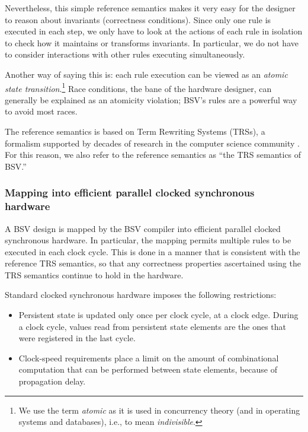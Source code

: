 \documentclass[twoside,letterpaper]{article}
\newcommand{\BSV}{BSV}
\begin{document}
Nevertheless, this simple reference semantics makes it very easy for 
the designer to reason about invariants (correctness conditions). Since 
only one rule is executed in each step, we only have to look at the 
actions of each rule in isolation to check how it maintains or transforms 
invariants. In particular, we do not have to consider interactions with 
other rules executing simultaneously.

Another way of saying this is: each rule execution can be viewed as an
\emph{atomic state transition}.\footnote{ We use the term
\emph{atomic} as it is used in concurrency theory (and in operating
systems and databases), i.e., to mean \emph{indivisible}.  }  Race
conditions, the bane of the hardware designer, can generally be
explained as an atomicity violation; {\BSV}'s rules are a powerful way
to avoid most races.

The reference semantics is based on Term Rewriting Systems (TRSs), a
formalism supported by decades of research in the computer science
community {\cite{Terese2003}}.  For this reason, we also refer to the
reference semantics as ``the TRS semantics of {\BSV}.''


\subsubsection{Mapping into efficient parallel clocked synchronous hardware}

\label{sec-mapping-rules-to-clocks}

A {\BSV} design is mapped by the {\BSV} compiler into efficient
parallel clocked synchronous hardware.  In particular, the mapping
permits multiple rules to be executed in each clock cycle.  This is
done in a manner that is consistent with the reference TRS semantics,
so that any correctness properties ascertained using the TRS semantics
continue to hold in the hardware.

Standard clocked synchronous hardware imposes the following
restrictions:
\begin{itemize}
\item
Persistent state is updated only once per clock cycle, at a clock edge.
During a clock cycle, values read from persistent state elements are 
the ones that were registered in the last cycle.

\item
Clock-speed requirements place a limit on the amount of combinational
computation that can be performed between state elements, because of
propagation delay.
\end{itemize}
\end{document}
